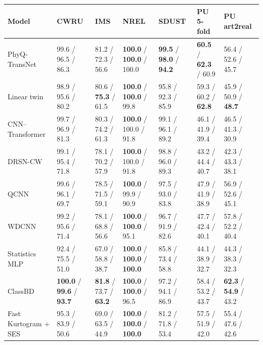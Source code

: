 \begin{tabular}{lllllll}
\toprule
Model & CWRU & IMS & NREL & SDUST & PU 5-fold & PU art2real \\
\midrule
PhyQ-TransNet & 99.6 / 96.5 / 86.3 & 81.2 / 72.3 / 56.6 & \textbf{100.0} / \textbf{100.0} / 100.0 & \textbf{99.5} / \textbf{98.0} / \textbf{94.2} & \textbf{60.5} / \textbf{62.3} / 60.9 & 56.4 / 52.6 / 45.7 \\
Linear twin & 98.9 / 95.6 / 80.2 & 80.6 / \textbf{75.3} / 61.5 & \textbf{100.0} / \textbf{100.0} / 99.8 & 95.8 / 92.3 / 85.9 & 59.3 / 60.2 / \textbf{62.8} & 45.9 / 50.9 / \textbf{48.7} \\
CNN--Transformer & 99.7 / 96.9 / 81.3 & 80.3 / 74.2 / 61.3 & \textbf{100.0} / 100.0 / 91.8 & 99.1 / 96.1 / 89.2 & 46.1 / 41.9 / 39.4 & 46.5 / 41.3 / 30.9 \\
DRSN-CW & 99.1 / 95.4 / 71.8 & 78.1 / 70.2 / 57.9 & \textbf{100.0} / 100.0 / 91.8 & 98.8 / 96.0 / 89.3 & 43.2 / 44.4 / 40.7 & 42.3 / 43.3 / 38.1 \\
QCNN & 99.6 / 96.1 / 69.7 & 78.5 / 71.5 / 59.1 & \textbf{100.0} / 99.9 / 90.9 & 97.5 / 93.0 / 83.8 & 47.9 / 41.9 / 38.9 & 56.9 / 52.6 / 45.1 \\
WDCNN & 99.2 / 95.6 / 71.4 & 78.1 / 68.8 / 56.6 & \textbf{100.0} / \textbf{100.0} / 95.1 & 96.7 / 91.9 / 82.6 & 47.7 / 42.4 / 40.1 & 57.8 / 52.2 / 40.4 \\
Statistics MLP & 92.4 / 75.5 / 51.0 & 67.0 / 58.8 / 38.7 & \textbf{100.0} / \textbf{100.0} / \textbf{100.0} & 85.8 / 73.4 / 58.8 & 44.1 / 38.9 / 32.7 & 44.3 / 38.3 / 32.3 \\
ClassBD & \textbf{100.0} / \textbf{99.6} / \textbf{93.7} & \textbf{81.8} / 73.7 / \textbf{63.2} & \textbf{100.0} / \textbf{100.0} / 96.5 & 97.2 / 94.1 / 86.9 & 58.4 / 53.2 / 43.7 & \textbf{62.3} / \textbf{54.9} / 43.2 \\
Fast Kurtogram + SES & 95.3 / 83.9 / 50.6 & 69.0 / 63.5 / 44.9 & \textbf{100.0} / \textbf{100.0} / \textbf{100.0} & 81.2 / 71.8 / 53.4 & 57.5 / 51.9 / 42.0 & 55.4 / 47.6 / 42.6 \\
\bottomrule
\end{tabular}